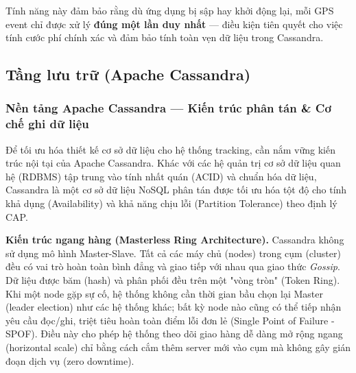 Tính năng này đảm bảo rằng dù ứng dụng bị sập hay khởi động lại, mỗi GPS event chỉ được xử lý \textbf{đúng một lần duy nhất} — điều kiện tiên quyết cho việc tính cước phí chính xác và đảm bảo tính toàn vẹn dữ liệu trong Cassandra.

\subsection{Tầng lưu trữ (Apache Cassandra)}
\label{sec:storage-layer}

\subsubsection{Nền tảng Apache Cassandra — Kiến trúc phân tán \& Cơ chế ghi dữ liệu}
\label{sec:cassandra-foundation}

Để tối ưu hóa thiết kế cơ sở dữ liệu cho hệ thống tracking, cần nắm vững kiến trúc nội tại của Apache Cassandra. Khác với các hệ quản trị cơ sở dữ liệu quan hệ (RDBMS) tập trung vào tính nhất quán (ACID) và chuẩn hóa dữ liệu, Cassandra là một cơ sở dữ liệu NoSQL phân tán được tối ưu hóa tột độ cho tính khả dụng (Availability) và khả năng chịu lỗi (Partition Tolerance) theo định lý CAP.

\bigskip
\noindent
\textbf{Kiến trúc ngang hàng (Masterless Ring Architecture).} Cassandra không sử dụng mô hình Master-Slave. Tất cả các máy chủ (nodes) trong cụm (cluster) đều có vai trò hoàn toàn bình đẳng và giao tiếp với nhau qua giao thức \textit{Gossip}. Dữ liệu được băm (hash) và phân phối đều trên một "vòng tròn" (Token Ring). Khi một node gặp sự cố, hệ thống không cần thời gian bầu chọn lại Master (leader election) như các hệ thống khác; bất kỳ node nào cũng có thể tiếp nhận yêu cầu đọc/ghi, triệt tiêu hoàn toàn điểm lỗi đơn lẻ (Single Point of Failure - SPOF). Điều này cho phép hệ thống theo dõi giao hàng dễ dàng mở rộng ngang (horizontal scale) chỉ bằng cách cắm thêm server mới vào cụm mà không gây gián đoạn dịch vụ (zero downtime).

